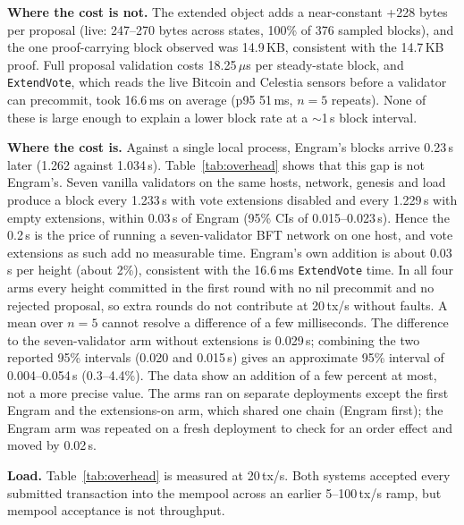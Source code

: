 \textbf{Where the cost is not.} The extended object adds a near-constant
+228 bytes per proposal (live: 247--270 bytes across states, 100\% of 376
sampled blocks), and the one proof-carrying block observed was 14.9\,KB,
consistent with the 14.7\,KB proof. Full proposal validation costs
18.25\,$\mu$s per steady-state block, and \texttt{ExtendVote}, which reads
the live Bitcoin and Celestia sensors before a validator can precommit, took
16.6\,ms on average (p95 51\,ms, $n{=}5$ repeats). None of these is large
enough to explain a lower block rate at a $\sim$1\,s block interval.

\textbf{Where the cost is.} Against a single local process, Engram's blocks
arrive 0.23\,s later (1.262 against 1.034\,s). Table~\ref{tab:overhead} shows
that this gap is not Engram's. Seven vanilla validators on the same hosts,
network, genesis and load produce a block every 1.233\,s with vote extensions
disabled and every 1.229\,s with empty extensions, within 0.03\,s of Engram
(95\% CIs of 0.015--0.023\,s). Hence the 0.2\,s is the price of running a
seven-validator BFT network on one host, and vote extensions as such add no
measurable time. Engram's own addition is about 0.03\,s per height (about
2\%), consistent with the 16.6\,ms \texttt{ExtendVote} time. In all four arms every
height committed in the first round with no nil precommit and no rejected
proposal, so extra rounds do not contribute at 20\,tx/s without faults. A
mean over $n{=}5$ cannot resolve a difference of a few milliseconds. The
difference to the seven-validator arm without extensions is 0.029\,s;
combining the two reported 95\% intervals (0.020 and 0.015\,s) gives an
approximate 95\% interval of 0.004--0.054\,s (0.3--4.4\%). The data show an
addition of a few percent at most, not a more precise value. The
arms ran on separate deployments except the first Engram and the
extensions-on arm, which shared one chain (Engram first); the Engram arm was
repeated on a fresh deployment to check for an order effect and moved by
0.02\,s.

\textbf{Load.} Table~\ref{tab:overhead} is measured at 20\,tx/s. Both
systems accepted every submitted transaction into the mempool across an
earlier 5--100\,tx/s ramp, but mempool acceptance is not throughput.
